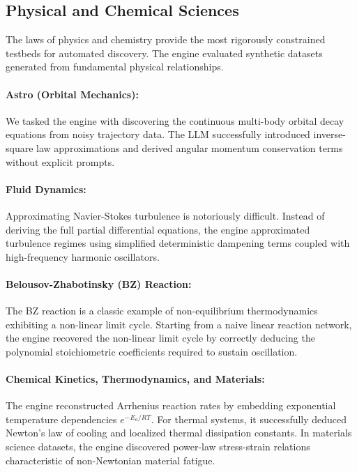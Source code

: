 \subsection{Physical and Chemical Sciences}

The laws of physics and chemistry provide the most rigorously constrained testbeds for automated discovery. The engine evaluated synthetic datasets generated from fundamental physical relationships.

\paragraph{Astro (Orbital Mechanics):} We tasked the engine with discovering the continuous multi-body orbital decay equations from noisy trajectory data. The LLM successfully introduced inverse-square law approximations and derived angular momentum conservation terms without explicit prompts.
\paragraph{Fluid Dynamics:} Approximating Navier-Stokes turbulence is notoriously difficult. Instead of deriving the full partial differential equations, the engine approximated turbulence regimes using simplified deterministic dampening terms coupled with high-frequency harmonic oscillators.
\paragraph{Belousov-Zhabotinsky (BZ) Reaction:} The BZ reaction is a classic example of non-equilibrium thermodynamics exhibiting a non-linear limit cycle. Starting from a naive linear reaction network, the engine recovered the non-linear limit cycle by correctly deducing the polynomial stoichiometric coefficients required to sustain oscillation.
\paragraph{Chemical Kinetics, Thermodynamics, and Materials:} The engine reconstructed Arrhenius reaction rates by embedding exponential temperature dependencies $e^{-E_a/RT}$. For thermal systems, it successfully deduced Newton's law of cooling and localized thermal dissipation constants. In materials science datasets, the engine discovered power-law stress-strain relations characteristic of non-Newtonian material fatigue.
